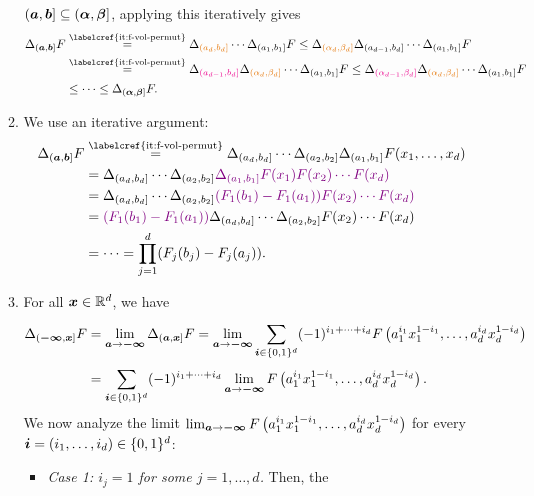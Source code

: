 \begin{enumerate}
\begin{pf}
\begin{enumerate}
\((\bm{a},\bm{b}]\subseteq (\bm{\alpha},\bm{\beta}]\), applying this
iteratively gives \begin{align*}
\Delta_{(\vect{a},\vect{b}]}F
&\overset{\text{\labelcref{it:f-vol-permut}}}{=}
\Delta_{\orc{(a_d,b_d]}}\dotsb\Delta_{(a_1,b_1]}F
\le\Delta_{\orc{(\alpha_d,\beta_d]}}\Delta_{(a_{d-1},b_d]}\dotsb\Delta_{(a_1,b_1]}F \\
&\overset{\text{\labelcref{it:f-vol-permut}}}{=}
\Delta_{\mgc{(a_{d-1},b_d]}}\Delta_{\orc{(\alpha_d,\beta_d]}}\dotsb\Delta_{(a_1,b_1]}F
\le\Delta_{\mgc{(\alpha_{d-1},\beta_d]}}\Delta_{\orc{(\alpha_d,\beta_d]}}\dotsb\Delta_{(a_1,b_1]}F \\
&\le\dotsb\le\Delta_{(\vect{\alpha},\vect{\beta}]}F.
\end{align*}
\item We use an iterative argument:
\begin{align*}
\Delta_{(\vect{a},\vect{b}]}F&\overset{\text{\labelcref{it:f-vol-permut}}}{=}
\Delta_{(a_d,b_d]}\dotsb\Delta_{(a_2,b_2]}\Delta_{(a_1,b_1]}F(x_1,\dotsc,x_d) \\
&=\Delta_{(a_d,b_d]}\dotsb\Delta_{(a_2,b_2]}\vc{\Delta_{(a_1,b_1]}F(x_1)F(x_2)\dotsb F(x_d)} \\
&=\Delta_{(a_d,b_d]}\dotsb\Delta_{(a_2,b_2]}\vc{(F_1(b_1)-F_1(a_1))F(x_2)\dotsb F(x_d)} \\
&=\vc{(F_1(b_1)-F_1(a_1))}\Delta_{(a_d,b_d]}\dotsb\Delta_{(a_2,b_2]}F(x_2)\dotsb F(x_d) \\
&=\dotsb=\prod_{j=1}^{d}(F_j(b_j)-F_j(a_j)).
\end{align*}
\item For all \(\bm{x}\in\mathbb{R}^d\), we have
\begin{align}
\nonumber\Delta_{(\bm{-\infty},\bm{x}]}F
&=\lim_{\bm{a}\to\bm{-\infty}}\Delta_{(\bm{a},\bm{x}]}F
=\lim_{\bm{a}\to\bm{-\infty}}\sum_{\bm{i}\in\{0,1\}^{d}}^{}(-1)^{i_{1}+\dotsb+i_{d}}
F\left(a_1^{i_1}x_1^{1-i_1},\dotsc,a_{d}^{i_d}x_{d}^{1-i_{d}}\right) \\
\label{eq:sum-lim-vol}&=\sum_{\bm{i}\in\{0,1\}^{d}}^{}(-1)^{i_{1}+\dotsb+i_{d}}\lim_{\bm{a}\to\bm{-\infty}}
F\left(a_1^{i_1}x_1^{1-i_1},\dotsc,a_{d}^{i_d}x_{d}^{1-i_{d}}\right).
\end{align}
We now analyze the limit \(\lim_{\bm{a}\to\bm{-\infty}}
F\left(a_1^{i_1}x_1^{1-i_1},\dotsc,a_{d}^{i_d}x_{d}^{1-i_{d}}\right)\) for
every \(\bm{i}=(i_1,\dotsc,i_d)\in\{0,1\}^{d}\):
\begin{itemize}
\item \emph{Case 1: \(i_j=1\) for some \(j=1,\dotsc,d\).} Then, the

\end{itemize}
\end{enumerate}
\end{pf}
\end{enumerate}
